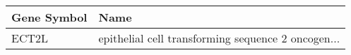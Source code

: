 \begin{tabular}{ll}
\toprule
Gene Symbol &                                               Name \\
\midrule
      ECT2L & epithelial cell transforming sequence 2 oncogen... \\
\bottomrule
\end{tabular}
